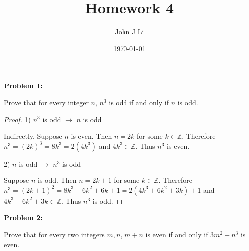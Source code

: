 \documentclass{article}
\title{Homework 4}
\date{\today}
\author{John J Li}
\begin{document}
    \maketitle
    \newpage


    \textbf{Problem 1:}

    Prove that for every integer $n$, $n^3$ is odd if and only if $n$ is odd.

    \begin{proof}
        1) $n^3$ is odd $\rightarrow$ $n$ is odd
        
        Indirectly. Suppose $n$ is even. Then $n=2k$ for some $k\in\mathbb{Z}$.
        Therefore $n^3=(2k)^3=8k^3=2(4k^3)$ and $4k^3 \in\mathbb{Z}$. Thus $n^3$ is even.

        2) $n$ is odd $\rightarrow$ $n^3$ is odd

        Suppose $n$ is odd. Then $n=2k+1$ for some $k\in\mathbb{Z}$. Therefore 
        $n^3=(2k+1)^2=8k^3+6k^2+6k+1=2(4k^3+6k^2+3k)+1$ and $4k^3+6k^2+3k \in\mathbb{Z}$.
        Thus $n^3$ is odd.
    \end{proof}


    \textbf{Problem 2:}

    Prove that for every two integers $m,n$, $m+n$ is even if and only if $3m^2+n^3$
    is even.
\end{document}
